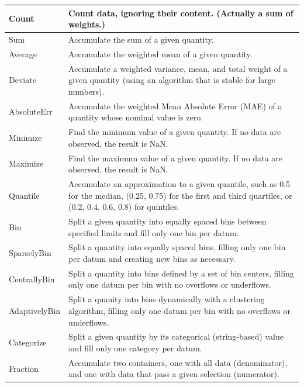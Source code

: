 \documentclass{beamer}
\begin{document}
\begin{frame}
\vspace{0.1 cm}
\hspace{-0.5 cm}\begin{minipage}{\linewidth}
\tiny
\renewcommand{\arraystretch}{1.3}
\begin{tabular}{| p{0.1\linewidth} p{0.9\linewidth} |}\hline
Count           & Count data, ignoring their content. (Actually a sum of weights.) \\\hline
Sum             & Accumulate the sum of a given quantity. \\
Average         & Accumulate the weighted mean of a given quantity. \\
Deviate         & Accumulate a weighted variance, mean, and total weight of a given quantity (using an algorithm that is stable for large numbers). \\
AbsoluteErr     & Accumulate the weighted Mean Absolute Error (MAE) of a quantity whose nominal value is zero. \\
Minimize        & Find the minimum value of a given quantity. If no data are observed, the result is NaN. \\
Maximize        & Find the maximum value of a given quantity. If no data are observed, the result is NaN. \\
Quantile        & Accumulate an approximation to a given quantile, such as 0.5 for the median, (0.25, 0.75) for the first and third quartiles, or (0.2, 0.4, 0.6, 0.8) for quintiles. \\\hline
Bin             & Split a given quantity into equally spaced bins between specified limits and fill only one bin per datum. \\
SparselyBin     & Split a quantity into equally spaced bins, filling only one bin per datum and creating new bins as necessary. \\
CentrallyBin    & Split a quantity into bins defined by a set of bin centers, filling only one datum per bin with no overflows or underflows. \\
AdaptivelyBin   & Split a quanity into bins dynamically with a clustering algorithm, filling only one datum per bin with no overflows or underflows. \\
Categorize      & Split a given quantity by its categorical (string-based) value and fill only one category per datum. \\\hline
Fraction        & Accumulate two containers, one with all data (denominator), and one with data that pass a given selection (numerator). \\

\end{tabular}
\end{minipage}
\end{frame}
\end{document}
